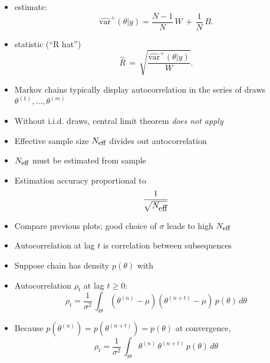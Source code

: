 \documentclass[10pt]{report}
\begin{document}
%
\begin{itemize}
\item {} estimate:
\[\textstyle
\widehat{\mbox{var}}^{+}\!(\theta|y)
= \frac{N-1}{N}\, W \, + \, \frac{1}{N} \, B.
\]
%
\vspace*{6pt}
\item {} statistic (``R hat'')
\[\textstyle
\hat{R} 
\, = \,
\sqrt{\frac{\widehat{\mbox{var}}^{+}\!(\theta|y)}{W}}.
\]
\end{itemize}


%
\begin{itemize}
\item Markov chains typically display autocorrelation in the series of
  draws $\theta^{(1)}, \ldots, \theta^{(m)}$
\item Without i.i.d. draws, central limit theorem \emph{does not apply}
\item Effective sample size $N_{\mbox{\footnotesize eff}}$ divides out
  autocorrelation
\item $N_{\mbox{\footnotesize eff}}$ must be estimated from sample
\vspace*{-6pt}
\item Estimation accuracy proportional to 
{\Large
\[
\frac{1}{\sqrt{N_{\mbox{\normalsize eff}}}}
\]
}
\item Compare previous plots; good choice of $\sigma$ leads to high 
$N_{\mbox{\footnotesize eff}}$
\end{itemize}


%
\begin{itemize}
\item Autocorrelation at lag $t$ is correlation between subsequences
\item  Suppose chain has density $p(\theta)$ with
\item Autocorrelation $\rho_t$ at lag $t \geq 0$:
\[
\rho_t  =  \frac{1}{\sigma^2} \, \int_{\Theta} (\theta^{(n)} - \mu)
       (\theta^{(n+t)} - \mu) \, p(\theta) \, d\theta
\]
\item Because $p(\theta^{(n)}) = p(\theta^{(n+t)}) = p(\theta)$ at convergence,
\[
\rho_t = \frac{1}{\sigma^2} \, \int_{\Theta} \theta^{(n)} \, \theta^{(n+t)} \, p(\theta) \, d\theta
\]
\end{itemize}
\end{document}
